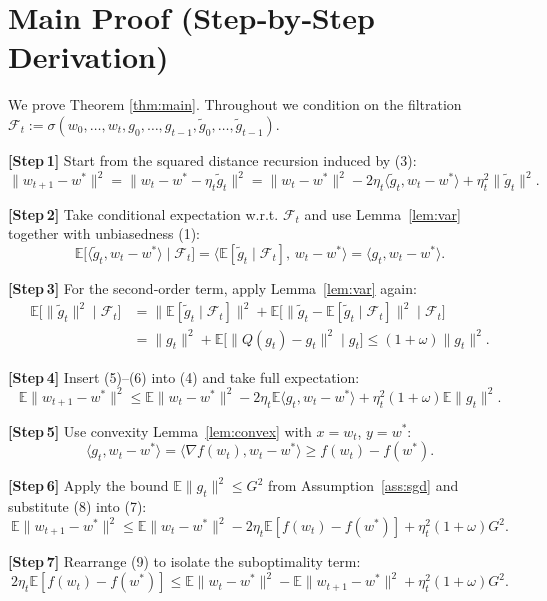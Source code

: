 \documentclass{article}
\begin{document}
\section*{Main Proof (Step‑by‑Step Derivation)}
We prove Theorem \ref{thm:main}.  Throughout we condition on the filtration
$\mathcal{F}_t:=\sigma(w_0,\dots,w_t,g_0,\dots,g_{t-1},\tilde g_0,\dots,\tilde g_{t-1})$.

\noindent\textbf{[Step 1]}  Start from the squared distance recursion induced by (3):
\[
\|w_{t+1}-w^*\|^2
 =\|w_t-w^*-\eta_t\tilde g_t\|^2
 =\|w_t-w^*\|^2-2\eta_t\langle\tilde g_t,w_t-w^*\rangle+\eta_t^2\|\tilde g_t\|^2 .
\tag{4}
\]

\noindent\textbf{[Step 2]}  Take conditional expectation w.r.t. $\mathcal{F}_t$ and use Lemma~\ref{lem:var} together with unbiasedness (1):
\[
\mathbb{E}\bigl[\langle\tilde g_t,w_t-w^*\rangle\mid\mathcal{F}_t\bigr]
 =\Big\langle\mathbb{E}[\tilde g_t\mid\mathcal{F}_t],\,w_t-w^*\Big\rangle
 =\langle g_t,w_t-w^*\rangle .
\tag{5}
\]

\noindent\textbf{[Step 3]}  For the second‑order term, apply Lemma~\ref{lem:var} again:
\[
\begin{aligned}
\mathbb{E}\bigl[\|\tilde g_t\|^2\mid\mathcal{F}_t\bigr]
&=\|\mathbb{E}[\tilde g_t\mid\mathcal{F}_t]\|^2
   +\mathbb{E}\bigl[\|\tilde g_t-\mathbb{E}[\tilde g_t\mid\mathcal{F}_t]\|^2\mid\mathcal{F}_t\bigr]\\
&=\|g_t\|^2+\mathbb{E}\bigl[\|Q(g_t)-g_t\|^2\mid g_t\bigr]
 \le (1+\omega)\|g_t\|^2 .
\end{aligned}
\tag{6}
\]

\noindent\textbf{[Step 4]}  Insert (5)–(6) into (4) and take full expectation:
\[
\mathbb{E}\|w_{t+1}-w^*\|^2
\le \mathbb{E}\|w_t-w^*\|^2
      -2\eta_t\mathbb{E}\langle g_t,w_t-w^*\rangle
      +\eta_t^2(1+\omega)\mathbb{E}\|g_t\|^2 .
\tag{7}
\]

\noindent\textbf{[Step 5]}  Use convexity Lemma~\ref{lem:convex} with $x=w_t$, $y=w^*$:
\[
\langle g_t,w_t-w^*\rangle
 =\langle \nabla f(w_t),w_t-w^*\rangle
 \ge f(w_t)-f(w^*) .
\tag{8}
\]

\noindent\textbf{[Step 6]}  Apply the bound $\mathbb{E}\|g_t\|^2\le G^2$ from Assumption~\ref{ass:sgd} and substitute (8) into (7):
\[
\mathbb{E}\|w_{t+1}-w^*\|^2
\le \mathbb{E}\|w_t-w^*\|^2
      -2\eta_t\mathbb{E}[f(w_t)-f(w^*)]
      +\eta_t^2(1+\omega)G^2 .
\tag{9}
\]

\noindent\textbf{[Step 7]}  Rearrange (9) to isolate the suboptimality term:
\[
2\eta_t\mathbb{E}[f(w_t)-f(w^*)]
\le \mathbb{E}\|w_t-w^*\|^2-\mathbb{E}\|w_{t+1}-w^*\|^2
      +\eta_t^2(1+\omega)G^2 .
\tag{10}
\]
\end{document}
